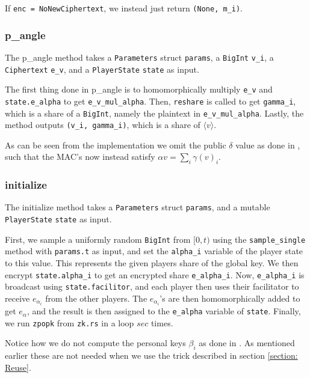 \documentclass[../main.tex]{subfiles}
\begin{document}
If \lstinline{enc = NoNewCiphertext}, we instead just return \lstinline{(None, m_i)}.

\subsubsection{p\_angle}
The p\_angle method takes a \lstinline{Parameters} struct \lstinline{params}, a \lstinline{BigInt} \lstinline{v_i}, a \lstinline{Ciphertext} \lstinline{e_v}, and a \lstinline{PlayerState} \lstinline{state} as input.

The first thing done in p\_angle is to homomorphically multiply \lstinline{e_v} and \lstinline{state.e_alpha} to get \lstinline{e_v_mul_alpha}. Then, \lstinline{reshare} is called to get \lstinline{gamma_i}, which is a share of a \lstinline{BigInt}, namely the plaintext in \lstinline{e_v_mul_alpha}. Lastly, the method outputs \lstinline{(v_i, gamma_i)}, which is a share of $\langle v \rangle$.

As can be seen from the implementation we omit the public $\delta$ value as done in \cite{damgaard2013practical}, such that the MAC's now instead satisfy $\alpha v = \sum_i \gamma(v)_i$.
 
\subsubsection{initialize}
The initialize method takes a \lstinline{Parameters} struct \lstinline{params}, and a mutable \lstinline{PlayerState} \lstinline{state} as input.

First, we sample a uniformly random \lstinline{BigInt} from $[0, t)$ using the \lstinline{sample_single} method with \lstinline{params.t} as input, and set the \lstinline{alpha_i} variable of the player state to this value. This represents the given players share of the global key. We then encrypt \lstinline{state.alpha_i} to get an encrypted share \lstinline{e_alpha_i}. Now, \lstinline{e_alpha_i} is broadcast using \lstinline{state.facilitor}, and each player then uses their facilitator to receive $e_{\alpha_i}$ from the other players. The $e_{\alpha_i}$'s are then homomorphically added to get $e_\alpha$, and the result is then assigned to the \lstinline{e_alpha} variable of \lstinline{state}. %
Finally, we run \lstinline{zpopk} from \lstinline{zk.rs} in a loop $sec$ times.

Notice how we do not compute the personal keys $\beta_i$ as done in \cite{damgaard2012multiparty}. As mentioned earlier these are not needed when we use the trick described in section \ref{section: Reuse}.
\end{document}
